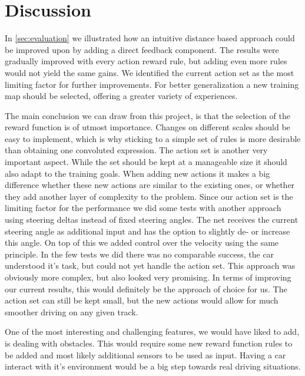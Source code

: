 
\section{Discussion}\label{sec:discussion}

In \ref{sec:evaluation} we illustrated how an intuitive distance based approach could be improved upon by adding a direct feedback component. The results were gradually improved with every action reward rule, but adding even more rules would not yield the same gains. We identified the current action set as the most limiting factor for further improvements. For better generalization a new training map should be selected, offering a greater variety of experiences.

The main conclusion we can draw from this project, is that the selection of the reward function is of utmost importance. Changes on different scales should be easy to implement, which is why sticking to a simple set of rules is more desirable than obtaining one convoluted expression. The action set is another very important aspect. While the set should be kept at a manageable size it should also adapt to the training goals. When adding new actions it makes a big difference whether these new actions are similar to the existing ones, or whether they add another layer of complexity to the problem. Since our action set is the limiting factor for the performance we did some tests with another approach using steering deltas instead of fixed steering angles. The net receives the current steering angle as additional input and has the option to slightly de- or increase this angle. On top of this we added control over the velocity using the same principle. In the few tests we did there was no comparable success, the car understood it's task, but could not yet handle the action set. This approach was obviously more complex, but also looked very promising. In terms of improving our current results, this would definitely be the approach of choice for us. The action set can still be kept small, but the new actions would allow for much smoother driving on any given track.

One of the most interesting and challenging features, we would have liked to add, is dealing with obstacles. This would require some new reward function rules to be added and most likely additional sensors to be used as input. Having a car interact with it's environment would be a big step towards real driving situations.

